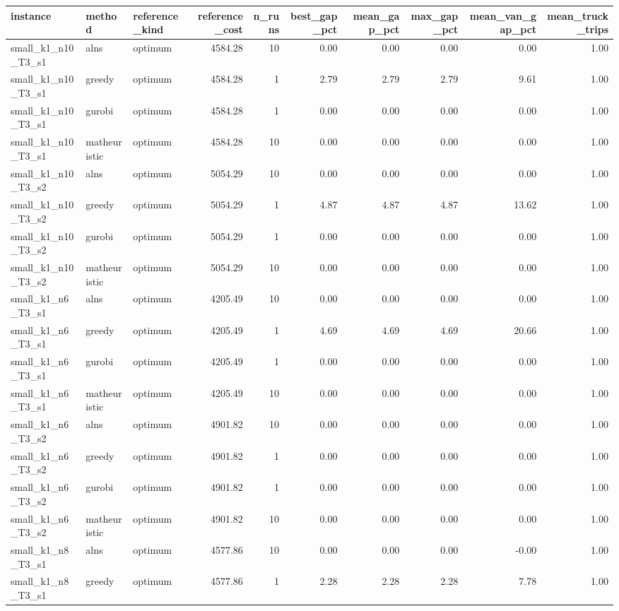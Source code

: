 \begin{tabular}{lllrrrrrrr}
\toprule
instance & method & reference\_kind & reference\_cost & n\_runs & best\_gap\_pct & mean\_gap\_pct & max\_gap\_pct & mean\_van\_gap\_pct & mean\_truck\_trips \\
\midrule
small\_k1\_n10\_T3\_s1 & alns & optimum & 4584.28 & 10 & 0.00 & 0.00 & 0.00 & 0.00 & 1.00 \\
small\_k1\_n10\_T3\_s1 & greedy & optimum & 4584.28 & 1 & 2.79 & 2.79 & 2.79 & 9.61 & 1.00 \\
small\_k1\_n10\_T3\_s1 & gurobi & optimum & 4584.28 & 1 & 0.00 & 0.00 & 0.00 & 0.00 & 1.00 \\
small\_k1\_n10\_T3\_s1 & matheuristic & optimum & 4584.28 & 10 & 0.00 & 0.00 & 0.00 & 0.00 & 1.00 \\
small\_k1\_n10\_T3\_s2 & alns & optimum & 5054.29 & 10 & 0.00 & 0.00 & 0.00 & 0.00 & 1.00 \\
small\_k1\_n10\_T3\_s2 & greedy & optimum & 5054.29 & 1 & 4.87 & 4.87 & 4.87 & 13.62 & 1.00 \\
small\_k1\_n10\_T3\_s2 & gurobi & optimum & 5054.29 & 1 & 0.00 & 0.00 & 0.00 & 0.00 & 1.00 \\
small\_k1\_n10\_T3\_s2 & matheuristic & optimum & 5054.29 & 10 & 0.00 & 0.00 & 0.00 & 0.00 & 1.00 \\
small\_k1\_n6\_T3\_s1 & alns & optimum & 4205.49 & 10 & 0.00 & 0.00 & 0.00 & 0.00 & 1.00 \\
small\_k1\_n6\_T3\_s1 & greedy & optimum & 4205.49 & 1 & 4.69 & 4.69 & 4.69 & 20.66 & 1.00 \\
small\_k1\_n6\_T3\_s1 & gurobi & optimum & 4205.49 & 1 & 0.00 & 0.00 & 0.00 & 0.00 & 1.00 \\
small\_k1\_n6\_T3\_s1 & matheuristic & optimum & 4205.49 & 10 & 0.00 & 0.00 & 0.00 & 0.00 & 1.00 \\
small\_k1\_n6\_T3\_s2 & alns & optimum & 4901.82 & 10 & 0.00 & 0.00 & 0.00 & 0.00 & 1.00 \\
small\_k1\_n6\_T3\_s2 & greedy & optimum & 4901.82 & 1 & 0.00 & 0.00 & 0.00 & 0.00 & 1.00 \\
small\_k1\_n6\_T3\_s2 & gurobi & optimum & 4901.82 & 1 & 0.00 & 0.00 & 0.00 & 0.00 & 1.00 \\
small\_k1\_n6\_T3\_s2 & matheuristic & optimum & 4901.82 & 10 & 0.00 & 0.00 & 0.00 & 0.00 & 1.00 \\
small\_k1\_n8\_T3\_s1 & alns & optimum & 4577.86 & 10 & 0.00 & 0.00 & 0.00 & -0.00 & 1.00 \\
small\_k1\_n8\_T3\_s1 & greedy & optimum & 4577.86 & 1 & 2.28 & 2.28 & 2.28 & 7.78 & 1.00 \\

\end{tabular}

